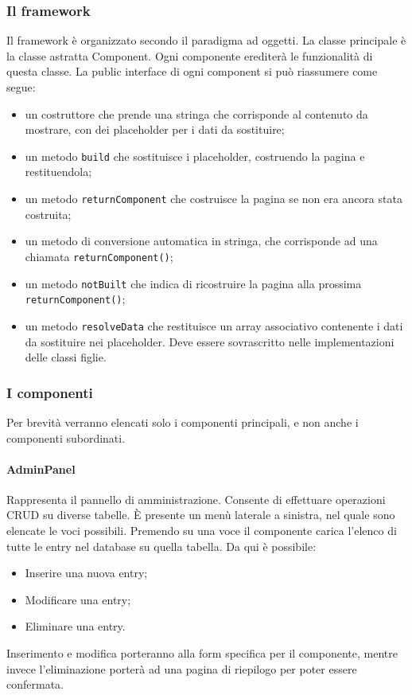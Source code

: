 \documentclass[12pt, a4paper]{article}
\begin{document}
    \subsubsection{Il framework}
    Il framework è organizzato secondo il paradigma ad oggetti. La classe principale è la classe astratta Component. Ogni componente erediterà le funzionalità di questa classe. La public interface di ogni component si può riassumere come segue:
    \begin{itemize}
        \item un costruttore che prende una stringa che corrisponde al contenuto da mostrare, con dei placeholder per i dati da sostituire;
        \item un metodo \texttt{build} che sostituisce i placeholder, costruendo la pagina e restituendola;
        \item un metodo \texttt{returnComponent} che costruisce la pagina se non era ancora stata costruita;
        \item un metodo di conversione automatica in stringa, che corrisponde ad una chiamata \texttt{returnComponent()};
        \item un metodo \texttt{notBuilt} che indica di ricostruire la pagina alla prossima \texttt{returnComponent()};
        \item un metodo \texttt{resolveData} che restituisce un array associativo contenente i dati da sostituire nei placeholder. Deve essere sovrascritto nelle implementazioni delle classi figlie.
    \end{itemize}

    \subsubsection{I componenti}
    Per brevità verranno elencati solo i componenti principali, e non anche i componenti subordinati.

    \paragraph{AdminPanel} Rappresenta il pannello di amministrazione. Consente di effettuare operazioni CRUD su diverse tabelle. È presente un menù laterale a sinistra, nel quale sono elencate le voci possibili. Premendo su una voce il componente carica l'elenco di tutte le entry nel database su quella tabella. Da qui è possibile:
    \begin{itemize}
        \item Inserire una nuova entry;
        \item Modificare una entry;
        \item Eliminare una entry.
    \end{itemize}
    Inserimento e modifica porteranno alla form specifica per il componente, mentre invece l'eliminazione porterà ad una pagina di riepilogo per poter essere confermata.
\end{document}
